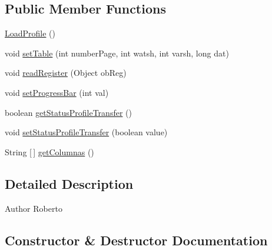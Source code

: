 \subsection*{Public Member Functions}
\begin{DoxyCompactItemize}
\item 
\hyperlink{classcom_1_1eneri_1_1scorpio__metertool_1_1ui_1_1_load_profile_a5f5ccbe478bc1f2194049f4095213443}{Load\+Profile} ()
\item 
void \hyperlink{classcom_1_1eneri_1_1scorpio__metertool_1_1ui_1_1_load_profile_a3659fdc735b14235ef781413540251a9}{set\+Table} (int number\+Page, int watsh, int varsh, long dat)
\item 
void \hyperlink{classcom_1_1eneri_1_1scorpio__metertool_1_1ui_1_1_load_profile_a54714bb1d46a7243d306659f880b76b8}{read\+Register} (Object ob\+Reg)
\item 
void \hyperlink{classcom_1_1eneri_1_1scorpio__metertool_1_1ui_1_1_load_profile_ae378884b28228978e57e53d6eb33512e}{set\+Progress\+Bar} (int val)
\item 
boolean \hyperlink{classcom_1_1eneri_1_1scorpio__metertool_1_1ui_1_1_load_profile_a28f089cd222be395770c651028119eaa}{get\+Status\+Profile\+Transfer} ()
\item 
void \hyperlink{classcom_1_1eneri_1_1scorpio__metertool_1_1ui_1_1_load_profile_a191a5f46b6b51df05a7b2b067c75519b}{set\+Status\+Profile\+Transfer} (boolean value)
\item 
String \mbox{[}$\,$\mbox{]} \hyperlink{classcom_1_1eneri_1_1scorpio__metertool_1_1ui_1_1_load_profile_a5de5443f3b11e13f19764059549e6ea6}{get\+Columnas} ()
\end{DoxyCompactItemize}


\subsection{Detailed Description}
\begin{DoxyAuthor}{Author}
Roberto 
\end{DoxyAuthor}


\subsection{Constructor \& Destructor Documentation}
\mbox{\label{classcom_1_1eneri_1_1scorpio__metertool_1_1ui_1_1_load_profile_a5f5ccbe478bc1f2194049f4095213443}} 

